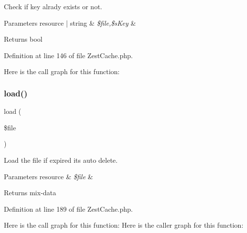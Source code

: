 Check if key alrady exists or not.


\begin{DoxyParams}[1]{Parameters}
resource | string & {\em \$file,\$s\+Key} & \\
\hline
\end{DoxyParams}
\begin{DoxyReturn}{Returns}
bool 
\end{DoxyReturn}


Definition at line 146 of file Zest\+Cache.\+php.

Here is the call graph for this function\+:
\mbox{\label{class_zest_1_1_cache_1_1_zest_cache_1_1_zest_cache_aaa4e95f27857ab78defda3e0c0b7039b}} 
\subsubsection{\texorpdfstring{load()}{load()}}
{\footnotesize\ttfamily load (\begin{DoxyParamCaption}\item[{}]{\$file }\end{DoxyParamCaption})}

Load the file if expired its auto delete.


\begin{DoxyParams}[1]{Parameters}
resource & {\em \$file} & \\
\hline
\end{DoxyParams}
\begin{DoxyReturn}{Returns}
mix-\/data 
\end{DoxyReturn}


Definition at line 189 of file Zest\+Cache.\+php.

Here is the call graph for this function\+:
Here is the caller graph for this function\+:
\mbox{\label{class_zest_1_1_cache_1_1_zest_cache_1_1_zest_cache_a930c737e9680d9b351c6e966bc0719b1}} 
